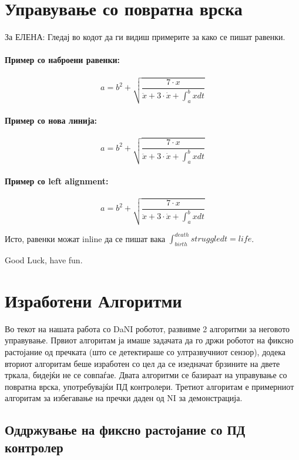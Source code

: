 \documentclass{article}
\begin{document}
\section{Управување со повратна врска}

За ЕЛЕНА:
Гледај во кодот да ги видиш примерите за како се пишат равенки.

\paragraph{Пример со наброени равенки:}
\begin{equation}
	a = b^2 + \sqrt{\frac{7 \cdot x}{{\ddot x + 3 \cdot \dot x + \int_a^b{x dt}}}}
\end{equation}


\paragraph{Пример со нова линија:}

$$ a = b^2 + \sqrt{\frac{7 \cdot x}{{\ddot x + 3 \cdot \dot x + \int_a^b{x dt}}}} $$



\paragraph{Пример со left alignment:}
\begin{flushleft}
$$ a = b^2 + \sqrt{\frac{7 \cdot x}{{\ddot x + 3 \cdot \dot x + \int_a^b{x dt}}}} $$
\end{flushleft}



Исто, равенки можат inline да се пишат вака $\int_{birth}^{death}{struggle dt} = life $.

Good Luck, have fun.

\section{Изработени Алгоритми}
Во текот на нашата работа со DaNI роботот, развивме 2 алгоритми за неговото управување. Првиот алгоритам ја имаше задачата да го држи роботот на фиксно растојание од пречката (што се детектираше со ултразвучниот сензор), додека вториот алгоритам беше изработен со цел да се изедначат брзините на двете тркала, бидејќи не се совпаѓае. Двата алгоритми се базираат на управување со повратна врска, употребувајќи ПД контролери. Третиот алгоритам е примерниот алгоритам за избегавање на пречки даден од NI за демонстрација. 
\subsection{Оддржување на фиксно растојание со ПД контролер}
\end{document}
